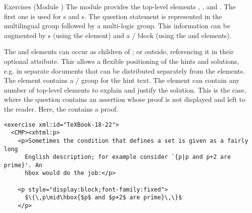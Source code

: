 \begin{tchapter}[id=quiz,short=Exercises]{Exercises (Module {})}
The {} module provides the top-level elements {},
{}, and {}. The first one is used for
{s} and {s}. The question statement is represented
in the multilingual {} group followed by a
multi-logic {} group. This information can be
augmented by {s} (using the {} element) and a
{}/{} block (using the {} and
{} elements).

The {} and {} elements can occur as children of
{}; or outside, referencing it in their optional
{} attribute. This allows a flexible positioning of the hints and
solutions, e.g. in separate documents that can be distributed separately from the
{} elements.  The {} element contains a
{}/{} group for the hint text. The {} element
can contain any number of {\omdoc} top-level elements to explain and justify the solution.
This is the case, where the question contains an assertion whose proof is not displayed
and left to the reader. Here, the {} contains a proof.

\begin{lstlisting}[label=lst:texbook-exercise,escapechar=\%,
  caption={An Exercise from the {\TeX}Book},
  index={exercise,hint,solution}]
<exercise xml:id="TeXBook-18-22">
  <CMP><xhtml:p>
    <p>Sometimes the condition that defines a set is given as a fairly long
      English description; for example consider `{p|p and p+2 are prime}'. An 
      hbox would do the job:</p>

    <p style="display:block;font-family:fixed">
      $\{\,p\mid\hbox{$p$ and $p+2$ are prime}\,\}$
    </p>


\end{lstlisting}
\end{tchapter}
